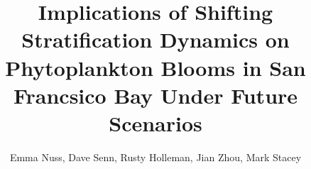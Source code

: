 \documentclass[preprint,review,12pt]{elsarticle}
\begin{document}
\newcommand\fnurl[2]{%
\href{#1}{#2}\footnote{\url{#1}}%
}

\begin{frontmatter}
\RaggedRight

\title{Implications of Shifting Stratification Dynamics on Phytoplankton Blooms in San Francsico Bay Under Future Scenarios}




\author{Emma Nuss, Dave Senn, Rusty Holleman, Jian Zhou, Mark Stacey}




\begin{keyword}



\end{keyword}

\end{frontmatter}

\linenumbers

\end{document}
